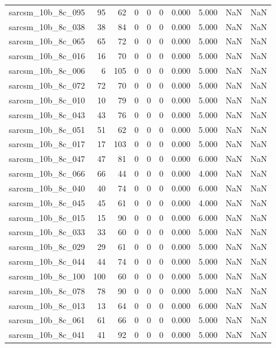 \documentclass{article}
\begin{document}
\begin{longtable}{lrrrrrrrrr}
sarcsm\_10b\_8c\_095 & 95 & 62 & 0 & 0 & 0 & 0.000 & 5.000 & NaN & NaN \\
sarcsm\_10b\_8c\_038 & 38 & 84 & 0 & 0 & 0 & 0.000 & 5.000 & NaN & NaN \\
sarcsm\_10b\_8c\_065 & 65 & 72 & 0 & 0 & 0 & 0.000 & 5.000 & NaN & NaN \\
sarcsm\_10b\_8c\_016 & 16 & 70 & 0 & 0 & 0 & 0.000 & 5.000 & NaN & NaN \\
sarcsm\_10b\_8c\_006 & 6 & 105 & 0 & 0 & 0 & 0.000 & 5.000 & NaN & NaN \\
sarcsm\_10b\_8c\_072 & 72 & 70 & 0 & 0 & 0 & 0.000 & 5.000 & NaN & NaN \\
sarcsm\_10b\_8c\_010 & 10 & 79 & 0 & 0 & 0 & 0.000 & 5.000 & NaN & NaN \\
sarcsm\_10b\_8c\_043 & 43 & 76 & 0 & 0 & 0 & 0.000 & 5.000 & NaN & NaN \\
sarcsm\_10b\_8c\_051 & 51 & 62 & 0 & 0 & 0 & 0.000 & 5.000 & NaN & NaN \\
sarcsm\_10b\_8c\_017 & 17 & 103 & 0 & 0 & 0 & 0.000 & 5.000 & NaN & NaN \\
sarcsm\_10b\_8c\_047 & 47 & 81 & 0 & 0 & 0 & 0.000 & 6.000 & NaN & NaN \\
sarcsm\_10b\_8c\_066 & 66 & 44 & 0 & 0 & 0 & 0.000 & 4.000 & NaN & NaN \\
sarcsm\_10b\_8c\_040 & 40 & 74 & 0 & 0 & 0 & 0.000 & 6.000 & NaN & NaN \\
sarcsm\_10b\_8c\_045 & 45 & 61 & 0 & 0 & 0 & 0.000 & 4.000 & NaN & NaN \\
sarcsm\_10b\_8c\_015 & 15 & 90 & 0 & 0 & 0 & 0.000 & 6.000 & NaN & NaN \\
sarcsm\_10b\_8c\_033 & 33 & 60 & 0 & 0 & 0 & 0.000 & 5.000 & NaN & NaN \\
sarcsm\_10b\_8c\_029 & 29 & 61 & 0 & 0 & 0 & 0.000 & 5.000 & NaN & NaN \\
sarcsm\_10b\_8c\_044 & 44 & 74 & 0 & 0 & 0 & 0.000 & 5.000 & NaN & NaN \\
sarcsm\_10b\_8c\_100 & 100 & 60 & 0 & 0 & 0 & 0.000 & 5.000 & NaN & NaN \\
sarcsm\_10b\_8c\_078 & 78 & 90 & 0 & 0 & 0 & 0.000 & 5.000 & NaN & NaN \\
sarcsm\_10b\_8c\_013 & 13 & 64 & 0 & 0 & 0 & 0.000 & 6.000 & NaN & NaN \\
sarcsm\_10b\_8c\_061 & 61 & 66 & 0 & 0 & 0 & 0.000 & 5.000 & NaN & NaN \\
sarcsm\_10b\_8c\_041 & 41 & 92 & 0 & 0 & 0 & 0.000 & 5.000 & NaN & NaN \\

\end{longtable}
\end{document}
